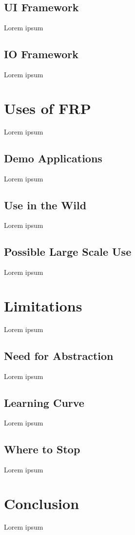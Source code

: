 \documentclass[12pt]{article}
\begin{document}
    \subsection{UI Framework}
    Lorem ipsum
    
    \subsection{IO Framework}
    Lorem ipsum
    
  \section{Uses of FRP}
  Lorem ipsum
  
    \subsection{Demo Applications}
    Lorem ipsum
    
    \subsection{Use in the Wild}
    Lorem ipsum
    
    \subsection{Possible Large Scale Use}
    Lorem ipsum
    
  \section{Limitations}
    Lorem ipsum
    
    \subsection{Need for Abstraction}
    Lorem ipsum
    
    \subsection{Learning Curve}
    Lorem ipsum
    
    \subsection{Where to Stop}
    Lorem ipsum
    
  \section{Conclusion}
  Lorem ipsum
  
\end{document}
